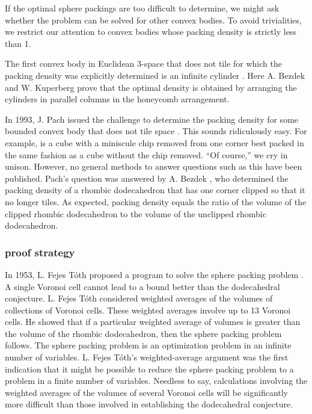 If the optimal sphere packings are too difficult to determine,
we might ask whether
the problem can be solved for other convex bodies.
To avoid trivialities, we restrict our attention to convex bodies
whose packing density is strictly less than 1.

  The first convex body in Euclidean 3-space that does not tile
for which the packing density was explicitly determined is
an infinite cylinder \cite{Bez90}.
Here A. Bezdek and W. Kuperberg prove
that the
optimal density is obtained by arranging the cylinders in
parallel columns in the honeycomb arrangement.

In 1993, J. Pach issued
the challenge to determine the packing density for some bounded convex
body that does not tile space \cite{MP93}.  This sounds ridiculously
easy.  For example, is a cube with a miniscule chip removed from one corner
best packed in the same fashion as a cube without the chip removed.
``Of course,'' we cry in unison.  However, no general methods to answer
questions such as this have been published.
Pach's question was answered by
A. Bezdek \cite{Bez94}, who determined the packing density of a rhombic
dodecahedron that has one corner clipped so that it no longer tiles.
As expected, packing density equals the ratio of the
volume of the clipped
rhombic dodecahedron to the volume of the unclipped rhombic dodecahedron.

\subsubsection{proof strategy}

In 1953, L. Fejes T\'oth proposed a program to solve the
sphere packing problem \cite{Fej53}.
A single Voronoi cell cannot lead to a bound better
than the dodecahedral conjecture.   L. Fejes T\'oth considered
weighted averages of the volumes of collections of Voronoi cells.
 These weighted
averages involve up to 13 Voronoi cells.  He showed that if a particular
weighted average of volumes is greater than the volume of the
rhombic dodecahedron, then the sphere packing problem follows.
The sphere packing problem is an optimization problem in an infinite
number of variables.  L. Fejes T\'oth's weighted-average argument
was the first indication that it might be possible to reduce
the sphere packing problem to a problem in a finite number of variables.
Needless to say, calculations involving the weighted averages of the
volumes of
several Voronoi cells will be significantly more difficult than those
involved in establishing the dodecahedral conjecture.

